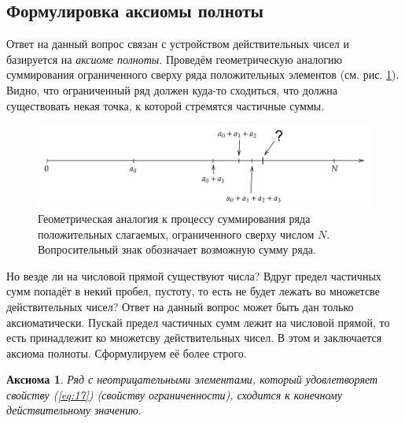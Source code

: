 \documentclass[12pt]{article}
\newtheorem{axiom}{Аксиома}[section]
\begin{document}
\subsection{Формулировка аксиомы полноты}
Ответ на данный вопрос связан с устройством действительных чисел и базируется на \emph{аксиоме полноты}. Проведём геометрическую аналогию суммирования ограниченного сверху ряда положительных элементов (см. рис. \ref{fig:3}). Видно, что ограниченный ряд должен куда\--то сходиться, что должна существовать некая точка, к которой стремятся частичные суммы.
\begin{figure}[ht]
    \centering
    \includegraphics[width = 1\textwidth]{fig3.png}
    \caption{Геометрическая аналогия к процессу суммирования ряда положительных слагаемых, ограниченного сверху числом $N$. Вопросительный знак обозначает возможную сумму ряда.}
    \label{fig:3}
\end{figure}
Но везде ли на числовой прямой существуют числа? Вдруг предел частичных сумм попадёт в некий пробел, пустоту, то есть не будет лежать во множетсве действительных чисел? Ответ на данный вопрос может быть дан только аксиоматически. Пускай предел частичных сумм лежит на числовой прямой, то есть принадлежит ко множетсву действительных чисел. В этом и заключается аксиома полноты. Сформулируем её более строго. 
\begin{axiom}
{Ряд с неотрицательными элементами, который удовлетворяет свойству (\ref{eq:17}) (свойству ограниченности), сходится к конечному действительному значению}.
\end{axiom}
\end{document}
